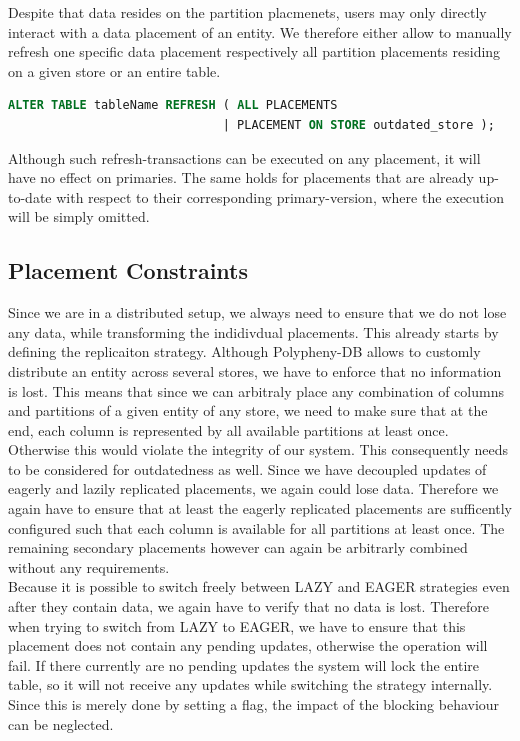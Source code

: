 Despite that data resides on the partition placmenets, users may only directly interact with a data placement of an entity.
We therefore either allow to manually refresh one specific data placement respectively all partition placements residing on a given store or an entire table.

\begin{lstlisting}[language=sql, caption={SQL Statement Syntax for an On-Demand Refresh Operation},label={lst:refresh}]
ALTER TABLE tableName REFRESH ( ALL PLACEMENTS 
                              | PLACEMENT ON STORE outdated_store );
\end{lstlisting}

Although such refresh-transactions can be executed on any placement, it will have no effect on primaries. 
The same holds for placements that are already up-to-date with respect to their corresponding primary-version, where the execution will be simply omitted.





\subsection{Placement Constraints}
\label{sec:constraints}

Since we are in a distributed setup, we always need to ensure that we do not lose any data, while transforming the indidivdual placements. 
This already starts by defining the replicaiton strategy. Although Polypheny-DB allows to customly distribute an entity across several stores, we have to enforce that no 
information is lost. This means that since we can arbitraly place any combination of columns and partitions of a given entity of any store, we need to make sure that at the end, 
each column is represented by all available partitions at least once. Otherwise this would violate the integrity of our system. 
This consequently needs to be considered for outdatedness as well. Since we have decoupled updates of eagerly and lazily replicated placements, we again could lose data. 
Therefore we again have to ensure that at least the eagerly replicated placements are sufficently configured such that each column is available for all partitions at least once.
The remaining secondary placements however can again be arbitrarly combined without any requirements.\\
Because it is possible to switch freely between LAZY and EAGER strategies even after they contain data, we again have to verify that no data is lost.
Therefore when trying to switch from LAZY to EAGER, we have to ensure that this placement does not contain any pending updates, otherwise the operation will fail.
If there currently are no pending updates the system will lock the entire table, so it will not receive any updates while switching the strategy internally. 
Since this is merely done by setting a flag, the impact of the blocking behaviour can be neglected.\\

